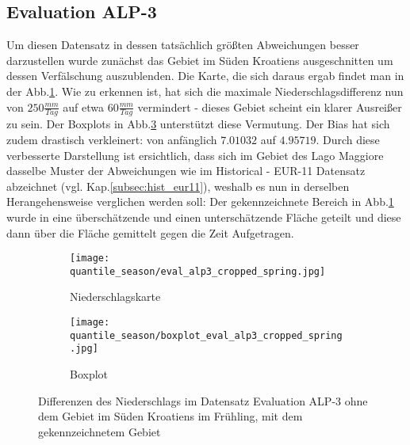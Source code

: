 \subsection{Evaluation ALP-3}\label{subsec:eval_alp3}
Um diesen Datensatz in dessen tatsächlich größten Abweichungen besser darzustellen wurde zunächst das Gebiet im Süden Kroatiens ausgeschnitten um dessen Verfälschung auszublenden. Die Karte, die sich daraus ergab findet man in der Abb.\ref{fig:seasons:cropped eval_alp_3}. Wie zu erkennen ist, hat sich die maximale Niederschlagsdifferenz nun von $250\frac{mm}{Tag}$ auf etwa $60\frac{mm}{Tag}$ vermindert - dieses Gebiet scheint ein klarer Ausreißer zu sein. Der Boxplots in Abb.\ref{fig:seasons:cropped eval_alp_3_boxplot} unterstützt diese Vermutung. Der Bias hat sich zudem drastisch verkleinert: von anfänglich $7.01032$ auf $4.95719$. Durch diese verbesserte Darstellung ist ersichtlich, dass sich im Gebiet des Lago Maggiore dasselbe Muster der Abweichungen wie im Historical - EUR-11 Datensatz abzeichnet (vgl. Kap.\ref{subsec:hist_eur11}), weshalb es nun in derselben Herangehensweise verglichen werden soll: Der gekennzeichnete Bereich in Abb.\ref{fig:seasons:cropped eval_alp_3} wurde in eine überschätzende und einen unterschätzende Fläche geteilt und diese dann über die Fläche gemittelt gegen die Zeit Aufgetragen.
\begin{figure}[h]
	\begin{subfigure}{0.49\textwidth}
		\texttt{[image: quantile\_season/eval\_alp3\_cropped\_spring.jpg]}
		\caption{Niederschlagskarte}
		\label{fig:seasons:cropped eval_alp_3}
	\end{subfigure}
	\begin{subfigure}{0.49\textwidth}
		\texttt{[image: quantile\_season/boxplot\_eval\_alp3\_cropped\_spring.jpg]}
		\caption{Boxplot}
		\label{fig:seasons:cropped eval_alp_3_boxplot}
	\end{subfigure}
	\caption{Differenzen des Niederschlags im Datensatz Evaluation ALP-3 ohne dem Gebiet im Süden Kroatiens im Frühling, mit dem gekennzeichnetem Gebiet}
\end{figure}

